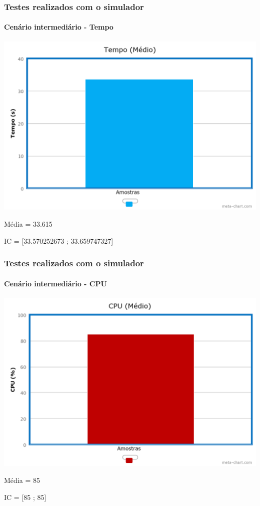\documentclass{beamer}
\begin{document}
\begin{frame}
	\frametitle{Testes realizados com o simulador}
	\framesubtitle{Cenário intermediário - Tempo}
	\begin{center}
	\includegraphics[scale=0.18]{chart(2).png}
	\end{center}
	\begin{center}
	Média = 33.615
	\end{center}
	\begin{center}
	IC = [33.570252673 ; 33.659747327]
	\end{center}
\end{frame}

\begin{frame}
	\frametitle{Testes realizados com o simulador}
	\framesubtitle{Cenário intermediário - CPU}
	\begin{center}
	\includegraphics[scale=0.18]{chart(3).png}
	\end{center}
	\begin{center}
	Média = 85
	\end{center}
	\begin{center}
	IC = [85 ; 85]
	\end{center}
\end{frame}
\end{document}
